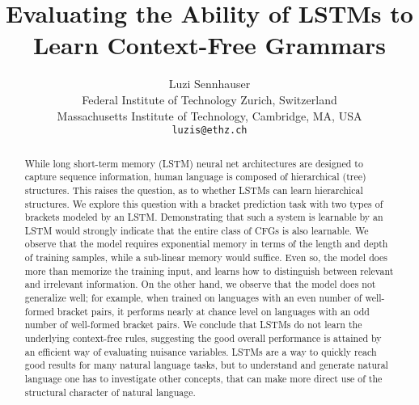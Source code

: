 \documentclass[11pt,a4paper]{article}
\title{Evaluating the Ability of LSTMs to Learn Context-Free Grammars}
\author{Luzi Sennhauser \\
  Federal Institute of Technology Zurich, Switzerland \\
  Massachusetts Institute of Technology, Cambridge, MA, USA \\
  {\tt luzis@ethz.ch}
}
\date{}
\begin{document}
\maketitle
\begin{abstract}


While long short-term memory (LSTM) neural net architectures are designed to capture sequence information, human language is composed of hierarchical (tree) structures. This raises the question, as to whether LSTMs can learn hierarchical structures. We explore this question with a bracket prediction task with two types of brackets modeled by an LSTM.%
Demonstrating that such a system is learnable by an LSTM would strongly indicate that the entire class of CFGs is also learnable.  We observe that the model requires exponential memory in terms of the length and depth of training samples, while a sub-linear memory would suffice.
Even so, the model does more than memorize the training input, and learns how to distinguish between relevant and irrelevant information. On the other hand, we observe that the model does not generalize well; for example, when trained on languages with an even number of well-formed bracket pairs, it performs nearly at chance level on languages with an odd number of well-formed bracket pairs.
We conclude that LSTMs do not learn the underlying context-free rules, suggesting the good overall performance is attained by an efficient way of evaluating nuisance variables. LSTMs are a way to quickly reach good results for many natural language tasks, but to understand and generate natural language one has to investigate other concepts, that can make more direct use of the structural character of natural language.
\end{abstract}
\end{document}
